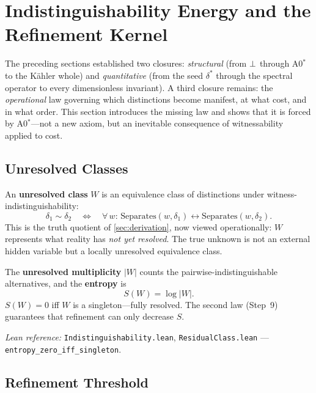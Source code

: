 
\section{Indistinguishability Energy and the Refinement Kernel}
\label{sec:manifestability}

The preceding sections established two closures: \emph{structural} (from $\bot$ through A0$^*$ to the K\"{a}hler whole) and \emph{quantitative} (from the seed $\delta^*$ through the spectral operator to every dimensionless invariant).  A third closure remains: the \emph{operational} law governing which distinctions become manifest, at what cost, and in what order.  This section introduces the missing law and shows that it is forced by A0$^*$---not a new axiom, but an inevitable consequence of witnessability applied to cost.

\subsection{Unresolved Classes}
\label{sec:manifestability:classes}

An \textbf{unresolved class} $W$ is an equivalence class of distinctions under witness-indistinguishability:
\[
\delta_1 \sim \delta_2
\quad\Longleftrightarrow\quad
\forall\, w:\, \mathrm{Separates}(w,\delta_1) \leftrightarrow \mathrm{Separates}(w,\delta_2).
\]
This is the truth quotient of \cref{sec:derivation}, now viewed operationally: $W$ represents what reality has \emph{not yet resolved}.  The true unknown is not an external hidden variable but a locally unresolved equivalence class.

The \textbf{unresolved multiplicity} $|W|$ counts the pairwise-indistinguishable alternatives, and the \textbf{entropy} is
\[
S(W) = \log |W|.
\]
$S(W) = 0$ iff $W$ is a singleton---fully resolved.  The second law (Step~9) guarantees that refinement can only decrease $S$.

\emph{Lean reference:} \texttt{Indistinguishability.lean}, \texttt{ResidualClass.lean} --- \texttt{entropy\_zero\_iff\_singleton}.

\subsection{Refinement Threshold}
\label{sec:manifestability:chi}

